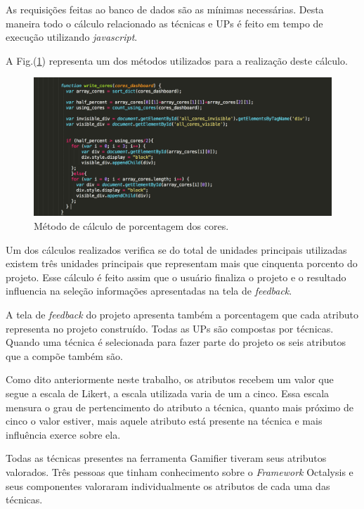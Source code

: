 As requisições feitas ao banco de dados são as mínimas necessárias. Desta maneira todo o cálculo relacionado as técnicas e UPs é feito em tempo de execução utilizando \textit{javascript}. 

A  Fig.(\ref{fig12}) representa um dos métodos utilizados para a realização deste cálculo.\newpage

\begin{figure}[h]
	\centering
		\includegraphics[keepaspectratio=true,scale=0.6]{figuras/cores.png}
	\caption{Método de cálculo de porcentagem dos cores.\label{fig12}}
\end{figure}

Um dos cálculos realizados verifica se do total de unidades principais utilizadas existem três unidades principais que representam mais que cinquenta porcento do projeto. Esse cálculo é feito assim que o usuário finaliza o projeto e o resultado influencia na seleção informações apresentadas na tela de \textit{feedback}. 

A tela de \textit{feedback} do projeto apresenta também a porcentagem que cada atributo representa no projeto construído. Todas as UPs são compostas por técnicas. Quando  uma técnica é selecionada para fazer parte do projeto os seis atributos que a compõe também são. 

Como dito anteriormente neste trabalho, os atributos recebem um valor que segue a escala de Likert, a escala utilizada varia de um a cinco.  Essa escala mensura o grau de pertencimento do atributo a técnica, quanto mais próximo de cinco o valor estiver, mais aquele atributo está presente na técnica e mais influência exerce sobre ela. 

Todas as técnicas presentes na ferramenta Gamifier tiveram seus atributos valorados. Três pessoas que tinham conhecimento sobre o \textit{Framework} Octalysis e seus componentes valoraram individualmente os atributos de cada uma das técnicas.

